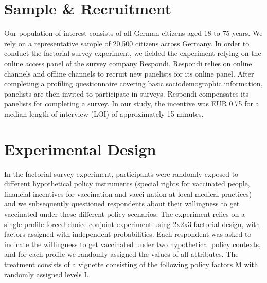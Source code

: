 \documentclass[12pt]{article}
\begin{document}
\tableofcontents


\clearpage
\section{Sample \& Recruitment}  

Our population of interest consists of all German citizens aged 18 to 75 years. We rely on a representative sample of 20,500 citizens across Germany. In order to conduct the factorial survey experiment, we fielded the experiment relying on the online access panel of the survey company Respondi. Respondi relies on online channels and offline channels to recruit new panelists for its online panel. After completing a proﬁling questionnaire covering basic sociodemographic information, panelists are then invited to participate in surveys. Respondi compensates its panelists for completing a survey. In our study, the incentive was EUR 0.75 for a median length of interview (LOI) of approximately 15 minutes.


\clearpage
\section{Experimental Design}
In the factorial survey experiment, participants were randomly exposed to different hypothetical policy instruments (special rights for vaccinated people, financial incentives for vaccination and vacci-nation at local medical practices) and we subsequently questioned respondents about their willingness to get vaccinated under these different policy scenarios. The experiment relies on a single profile forced choice conjoint experiment using 2x2x3 factorial design, with factors assigned with independent probabilities. Each respondent was asked to indicate the willingness to get vaccinated under two hypothetical policy contexts, and for each proﬁle we randomly assigned the values of all attributes. 
The treatment consists of a vignette consisting of the following policy factors M with randomly assigned levels L.
\end{document}
